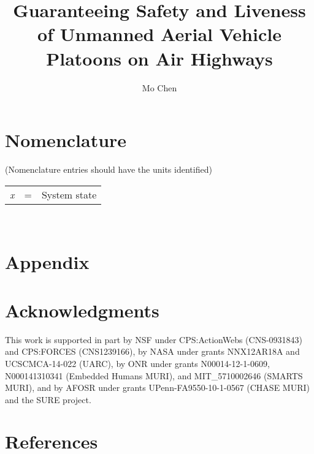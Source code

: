 \documentclass[journal]{aiaa-pretty}
\author{Mo Chen}
\title{Guaranteeing Safety and Liveness of Unmanned Aerial Vehicle Platoons on Air Highways}
\begin{document}
\maketitle

\section*{Nomenclature}
(Nomenclature entries should have the units identified)\\
\noindent\begin{tabular}{@{}lcl@{}}
\textit{x}  &=& System state \\
\end{tabular} \\














\section*{Appendix}

\section*{Acknowledgments}
This work is supported in part by NSF under CPS:ActionWebs (CNS-0931843) and CPS:FORCES (CNS1239166), by NASA under grants NNX12AR18A and UCSCMCA-14-022 (UARC), by ONR under grants N00014-12-1-0609, N000141310341 (Embedded Humans MURI), and MIT\_5710002646 (SMARTS MURI), and by AFOSR under grants UPenn-FA9550-10-1-0567 (CHASE MURI) and the SURE project.

\section*{References}
\end{document}
